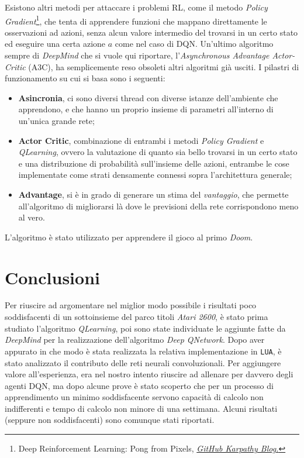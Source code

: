 \documentclass[twoside,twocolumn,10pt]{extarticle}
\theoremstyle{definition}
\begin{document}
	Esistono altri metodi per attaccare i problemi RL, come il metodo \textit{Policy Gradient}\footnote{Deep Reinforcement Learning: Pong from Pixels, \emph{\href{http://karpathy.github.io/2016/05/31/rl/}{GitHub Karpathy Blog.}}}, che tenta di apprendere funzioni che mappano direttamente le osservazioni ad azioni, senza alcun valore intermedio del trovarsi in un certo stato ed eseguire una certa azione $a$ come nel caso di DQN. Un'ultimo algoritmo sempre di \textit{DeepMind} che si vuole qui riportare, l'\textit{Asynchronous Advantage Actor-Critic}\cite{bib:a3c} (A3C), ha semplicemente reso obsoleti altri algoritmi già usciti. I pilastri di funzionamento su cui si basa sono i seguenti:
	\begin{itemize}
		\item \textbf{Asincronia}, ci sono diversi thread con diverse istanze dell'ambiente che apprendono, e che hanno un proprio insieme di parametri all'interno di un'unica grande rete;
		\item \textbf{Actor Critic}, combinazione di entrambi i metodi \textit{Policy Gradient} e \textit{Q\texttwelveudash Learning}, ovvero la valutazione di quanto sia bello trovarsi in un certo stato e una distribuzione di probabilità sull'insieme delle azioni, entrambe le cose implementate come strati densamente connessi sopra l'architettura generale;
		\item \textbf{Advantage}, si è in grado di generare un stima del \textit{vantaggio}, che permette all'algoritmo di migliorarsi là dove le previsioni della rete corrispondono meno al vero.
	\end{itemize}
	L'algoritmo è stato utilizzato per apprendere il gioco al primo \textit{Doom}.

	\section{Conclusioni}
		Per riuscire ad argomentare nel miglior modo possibile i risultati poco soddisfacenti di un sottoinsieme del parco titoli \textit{Atari 2600}, è stato prima studiato l'algoritmo \textit{Q\texttwelveudash Learning}, poi sono state individuate le aggiunte fatte da \textit{DeepMind} per la realizzazione dell'algoritmo \textit{Deep Q\texttwelveudash Network}. Dopo aver appurato in che modo è stata realizzata la relativa implementazione in \texttt{LUA}, è stato analizzato il contributo delle reti neurali convoluzionali. Per aggiungere valore all'esperienza, era nel nostro intento riuscire ad allenare per davvero degli agenti DQN, ma dopo alcune prove è stato scoperto che per un processo di apprendimento un minimo soddisfacente servono capacità di calcolo non indifferenti e tempo di calcolo non minore di una settimana. Alcuni risultati (seppure non soddisfacenti) sono comunque stati riportati.
		
\end{document}

